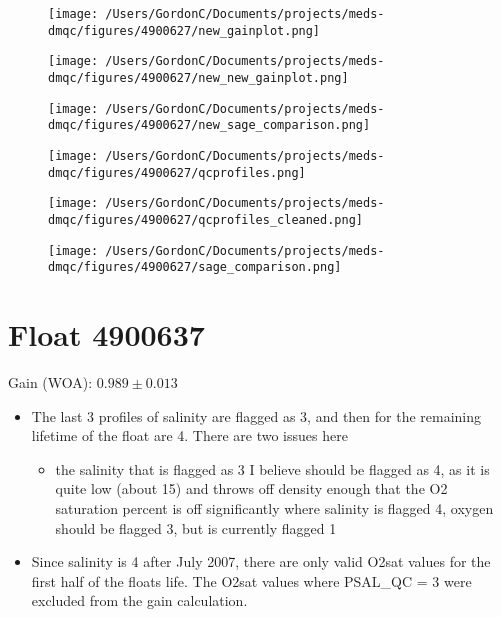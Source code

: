 \begin{figure}[H]
	\centering
	\texttt{[image: /Users/GordonC/Documents/projects/meds-dmqc/figures/4900627/new\_gainplot.png]}
	\caption{}
\end{figure}


\begin{figure}[H]
	\centering
	\texttt{[image: /Users/GordonC/Documents/projects/meds-dmqc/figures/4900627/new\_new\_gainplot.png]}
	\caption{}
\end{figure}


\begin{figure}[H]
	\centering
	\texttt{[image: /Users/GordonC/Documents/projects/meds-dmqc/figures/4900627/new\_sage\_comparison.png]}
	\caption{}
\end{figure}


\begin{figure}[H]
	\centering
	\texttt{[image: /Users/GordonC/Documents/projects/meds-dmqc/figures/4900627/qcprofiles.png]}
	\caption{}
\end{figure}


\begin{figure}[H]
	\centering
	\texttt{[image: /Users/GordonC/Documents/projects/meds-dmqc/figures/4900627/qcprofiles\_cleaned.png]}
	\caption{}
\end{figure}


\begin{figure}[H]
	\centering
	\texttt{[image: /Users/GordonC/Documents/projects/meds-dmqc/figures/4900627/sage\_comparison.png]}
	\caption{}
\end{figure}

\section{Float 4900637}

Gain (WOA): $0.989 \pm 0.013$

\begin{itemize}
	\item The last 3 profiles of salinity are flagged as 3, and then for the remaining lifetime of the float are 4. There are two issues here
	\begin{itemize}
		\item the salinity that is flagged as 3 I believe should be flagged as 4, as it is quite low (about 15) and throws off density enough that the O2 saturation percent is off significantly where salinity is flagged 4, oxygen should be flagged 3, but is currently flagged 1
	\end{itemize}
	\item Since salinity is 4 after July 2007, there are only valid O2sat values for the first half of the floats life. The O2sat values where PSAL\_QC = 3 were excluded from the gain calculation.
\end{itemize}


